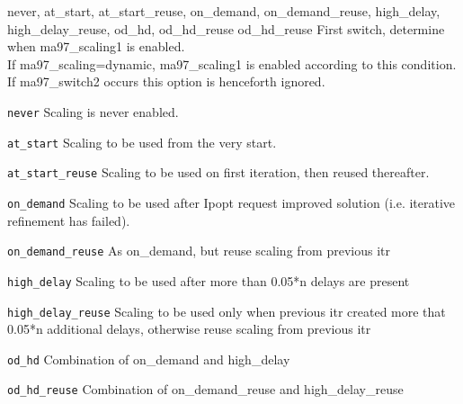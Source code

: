 %
{\ttfamily never, at\_start, at\_start\_reuse, on\_demand, on\_demand\_reuse, high\_delay, high\_delay\_reuse, od\_hd, od\_hd\_reuse}%
{od\_hd\_reuse}%
{First switch, determine when ma97\_scaling1 is enabled.\\
If ma97\_scaling=dynamic, ma97\_scaling1 is enabled according to this condition. If ma97\_switch2 occurs this option is henceforth ignored.}%
{\begin{list}{}{
\setlength{\parsep}{0em}
\setlength{\leftmargin}{5ex}
\setlength{\labelwidth}{2ex}
\setlength{\itemindent}{0ex}
\setlength{\topsep}{0pt}}
\item[\texttt{never}] Scaling is never enabled.
\item[\texttt{at\_start}] Scaling to be used from the very start.
\item[\texttt{at\_start\_reuse}] Scaling to be used on first iteration, then reused thereafter.
\item[\texttt{on\_demand}] Scaling to be used after Ipopt request improved solution (i.e. iterative refinement has failed).
\item[\texttt{on\_demand\_reuse}] As on\_demand, but reuse scaling from previous itr
\item[\texttt{high\_delay}] Scaling to be used after more than 0.05*n delays are present
\item[\texttt{high\_delay\_reuse}] Scaling to be used only when previous itr created more that 0.05*n additional delays, otherwise reuse scaling from previous itr
\item[\texttt{od\_hd}] Combination of on\_demand and high\_delay
\item[\texttt{od\_hd\_reuse}] Combination of on\_demand\_reuse and high\_delay\_reuse
\end{list}
}

